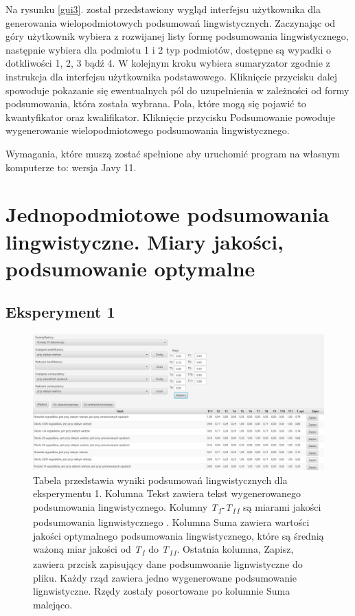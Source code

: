 \documentclass{classrep}
\begin{document}
\newpage

Na rysunku \ref{gui3}. został przedstawiony wygląd interfejsu użytkownika dla generowania wielopodmiotowych podsumowań lingwistycznych. Zaczynając od góry użytkownik wybiera z rozwijanej listy formę podsumowania lingwistycznego, następnie wybiera dla podmiotu 1 i 2 typ podmiotów, dostępne są wypadki o dotkliwości 1, 2, 3 bądź 4. W kolejnym kroku wybiera sumaryzator zgodnie z instrukcja dla interfejsu użytkownika podstawowego. Kliknięcie przycisku dalej spowoduje pokazanie się ewentualnych pól do uzupełnienia w zależności od formy podsumowania, która została wybrana. Pola, które mogą się pojawić to kwantyfikator oraz kwalifikator. Kliknięcie przycisku Podsumowanie powoduje wygenerowanie wielopodmiotowego podsumowania lingwistycznego.


Wymagania, które muszą zostać spełnione aby uruchomić program na własnym komputerze to: wersja Javy 11.

\newpage




\section{ Jednopodmiotowe podsumowania lingwistyczne. Miary jakości, podsumowanie optymalne}
\label{section:ex}
\subsection{Eksperyment 1}
\label{section:ex1}
\begin{figure}[h!]
\centering
\includegraphics[width=15cm]{ex1.png}
\vspace{-0.3cm}
\caption{Tabela przedstawia wyniki podsumowań lingwistycznych dla eksperymentu 1. Kolumna Tekst zawiera tekst wygenerowanego podsumowania lingwistycznego. Kolumny \textit{T\textsubscript{1}}-\textit{T\textsubscript{11}} są miarami jakości podsumowania lignwistycznego \cite{niewiadomski19}. Kolumna Suma zawiera wartości jakości optymalnego podsumowania lingwistycznego, które są średnią ważoną miar jakości od \textit{T\textsubscript{1}} do \textit{T\textsubscript{11}}. Ostatnia kolumna, Zapisz, zawiera przcisk zapisujący dane podsumwoanie lignwistyczne do pliku. Każdy rząd zawiera jedno wygenerowane podsumowanie lignwistyczne. Rzędy zostały posortowane po kolumnie Suma malejąco. }
\label{ex1}
\end{figure}
\end{document}
